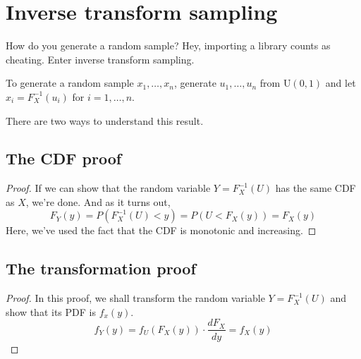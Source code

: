 \documentclass{scrreprt}
\begin{document}
\section{Inverse transform sampling}

How do you generate a random sample? Hey, importing a library counts as cheating. Enter inverse transform sampling.

\begin{theorem}
    To generate a random sample $x_1, \dots, x_n$, generate $u_1, \dots, u_n$ from $\text{U}(0, 1)$ and let $x_i = F_X^{-1}(u_i)$ for $i = 1, \dots, n$.
\end{theorem}

There are two ways to understand this result.

\subsection*{The CDF proof}
\begin{proof}
    If we can show that the random variable $Y = F_X^{-1}(U)$ has the same CDF as $X$, we're done. And as it turns out,
    $$F_Y(y) = P(F_X^{-1}(U) < y) = P(U < F_X(y)) = F_X(y)$$
    Here, we've used the fact that the CDF is monotonic and increasing.
\end{proof}

\subsection*{The transformation proof}
\begin{proof}
    In this proof, we shall transform the random variable $Y = F_X^{-1}(U)$ and show that its PDF is $f_x(y)$.
    $$f_Y(y) = f_U(F_X(y)) \cdot \dfrac{dF_X}{dy} = f_X(y)$$
\end{proof}
\end{document}

